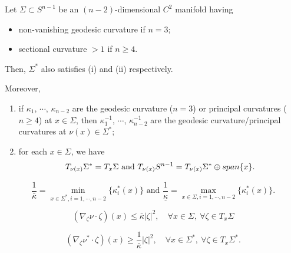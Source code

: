 \documentclass[10pt,a4paper]{amsart}
\begin{document}
\begin{lemma} \label{dual}
   Let $\Sigma \subset S^{n-1}$ be an $(n-2)$-dimensional $C^2$ manifold having
\begin{itemize}
  \item[(i)] non-vanishing geodesic curvature if $n=3$;
  \item[(ii)] sectional curvature $>1$ if $n \ge 4$.
\end{itemize}
  Then, $\Sigma^\ast$ also satisfies (i) and (ii) respectively.

  Moreover,
  \begin{enumerate}
  \item[(a)] if $\kappa_1$, $\cdots$, $\kappa_{n-2}$ are the geodesic curvature ($n=3$) or principal curvatures ($n\ge4$) at $x \in \Sigma$, then $\kappa_1^{-1}$, $\cdots$, $\kappa_{n-2}^{-1}$ are the geodesic curvature/principal curvatures at $\nu(x) \in \Sigma^\ast$;
  \item[(b)] for each $x \in \Sigma$, we have
  $$  T_{\nu(x)}\Sigma^\ast = T_{x}\Sigma  \mbox{ and } T_{\nu(x)}S^{n-1} = T_{\nu(x)}\Sigma^\ast \oplus {\rm span}\{x\}.  $$
  \end{enumerate}
\end{lemma}

\begin{equation}\label{bdds}
  \frac1{\bar\kappa}= \min_{x \in \Sigma^\ast,i =1,\cdots, n-2}\{\kappa_i^\ast(x)\} \mbox{ and } \frac1{\underline\kappa}= \max_{x \in \Sigma,i =1,\cdots, n-2}\{\kappa_i^\ast(x)\}.
\end{equation}

    \begin{equation}\label{II}
    (\nabla_\zeta \nu \cdot \zeta)(x) \le \bar \kappa|\zeta|^2, \quad \forall x \in \Sigma, \ \forall \zeta \in T_x\Sigma
\end{equation}

\begin{equation}\label{IIast}
    (\nabla_\zeta \nu^\ast \cdot \zeta)(x) \ge \frac{1}{\bar \kappa}|\zeta|^2, \quad \forall x \in \Sigma^\ast, \ \forall \zeta \in T_x\Sigma^\ast.
\end{equation}
\end{document}
